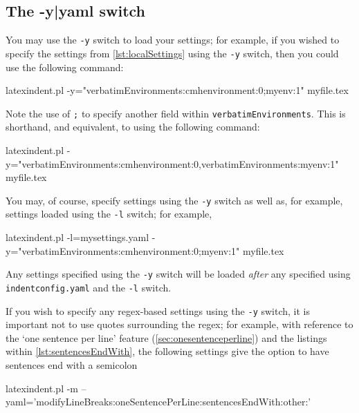 \subsection{The -y|yaml switch}\label{sec:yamlswitch}
 You%
 may use the \texttt{-y} switch to load your settings;  for example, if you wished to
 specify the settings from \cref{lst:localSettings} using the \texttt{-y} switch, then you
 could use the following command:

 \begin{commandshell}
latexindent.pl -y="verbatimEnvironments:cmhenvironment:0;myenv:1" myfile.tex
\end{commandshell}

 Note the use of \texttt{;} to specify another field within
 \texttt{verbatimEnvironments}. This is shorthand, and equivalent, to using the following
 command: 

 \begin{commandshell}
latexindent.pl -y="verbatimEnvironments:cmhenvironment:0,verbatimEnvironments:myenv:1" myfile.tex
\end{commandshell}

 You may, of course, specify settings using the \texttt{-y} switch as well as, for
 example, settings loaded using the \texttt{-l} switch; for example,  

 \begin{commandshell}
latexindent.pl -l=mysettings.yaml -y="verbatimEnvironments:cmhenvironment:0;myenv:1" myfile.tex
\end{commandshell}

 Any settings specified using the \texttt{-y} switch will be loaded \emph{after} any
 specified using \texttt{indentconfig.yaml} and the \texttt{-l} switch.

 If you wish to specify any regex-based settings using the \texttt{-y} switch,
  it is important not to use quotes
 surrounding the regex; for example, with reference to the `one sentence per line'
 feature (\vref{sec:onesentenceperline}) and the listings within
 \vref{lst:sentencesEndWith}, the following settings give the option to have sentences
 end with a semicolon 

 \begin{commandshell}
latexindent.pl -m --yaml='modifyLineBreaks:oneSentencePerLine:sentencesEndWith:other:\;'
\end{commandshell}

